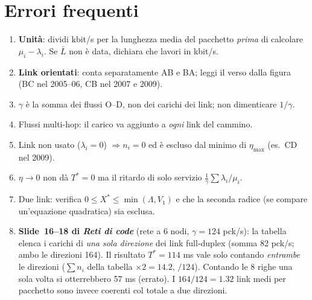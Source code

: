 \section{Errori frequenti}
\begin{attenzione}
\begin{enumerate}[leftmargin=*]
\item \textbf{Unità}: dividi kbit/s per la lunghezza media del pacchetto \emph{prima} di calcolare $\mu_i-\lambda_i$. Se $\bar L$ non è data, dichiara che lavori in kbit/s.
\item \textbf{Link orientati}: conta separatamente AB e BA; leggi il verso dalla figura (BC nel 2005--06, CB nel 2007 e 2009).
\item $\gamma$ è la somma dei flussi O--D, non dei carichi dei link; non dimenticare $1/\gamma$.
\item Flussi multi-hop: il carico va aggiunto a \emph{ogni} link del cammino.
\item Link non usato ($\lambda_i=0$) $\Rightarrow n_i=0$ ed è escluso dal minimo di $\eta_{\max}$ (es.\ CD nel 2009).
\item $\eta\to0$ non dà $T^*=0$ ma il ritardo di solo servizio $\frac1\gamma\sum\lambda_i/\mu_i$.
\item Due link: verifica $0\le X^*\le\min(\Lambda,V_1)$ e che la seconda radice (se compare un'equazione quadratica) sia esclusa.
\item \textbf{Slide~16--18 di \emph{Reti di code}} (rete a 6 nodi, $\gamma=124$ pck/s): la tabella elenca i carichi di \emph{una sola direzione} dei link full-duplex (somma 82 pck/s; ambo le direzioni 164). Il risultato $T^*=114$ ms vale solo contando \emph{entrambe} le direzioni ($\sum n_i$ della tabella $\times2=14.2$, $/124$). Contando le 8 righe una sola volta si otterrebbero 57 ms (errato). I $164/124=1.32$ link medi per pacchetto sono invece coerenti col totale a due direzioni.
\end{enumerate}
\end{attenzione}
